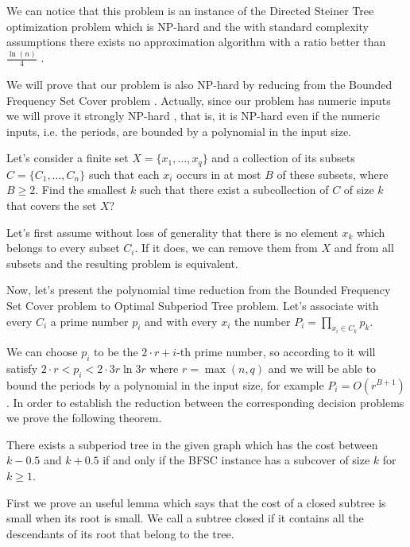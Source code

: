 We can notice that this problem is an instance of the Directed Steiner Tree optimization problem which is NP-hard and the with standard complexity assumptions there exists no approximation algorithm with a ratio better than $\frac {\ln (n)} 4$ \citep{zelikovsky1997series, ming2006fasterdsp}.

We will prove that our problem is also NP-hard by reducing from the Bounded Frequency Set Cover problem \citep{gary1979computers, cmulecture}. Actually, since our problem has numeric inputs we will prove it strongly NP-hard \citep{garey1978strong}, that is, it is NP-hard even if the numeric inputs, i.e. the periods, are bounded by a polynomial in the input size.

\begin{problem} Let's consider a finite set $X=\{x_1,\ldots,x_q\}$ and a collection of its subsets $C=\{C_1,\ldots, C_n\}$ such that each $x_i$ occurs in at most $B$ of these subsets, where $B \geq 2$. Find the smallest $k$ such that there exist a subcollection of $C$ of size $k$ that covers the set $X$?
\end{problem}

Let's first assume without loss of generality that there is no element $x_k$ which belongs to every subset $C_i$. If it does, we can remove them from $X$ and from all subsets and the resulting problem is equivalent.

Now, let’s present the polynomial time reduction from the Bounded Frequency Set Cover problem to Optimal Subperiod Tree problem. Let's associate with every $C_i$ a prime number $p_i$ and with every $x_i$ the number $P_i=\prod_{x_i\in C_k}p_k$.

We can choose $p_i$ to be the $2\cdot r+i$-th prime number, so according to \citep{jaroma2005upper} it will satisfy $2\cdot r <p_i<2\cdot 3r \ln 3r$ where $r=\max(n, q)$ and we will be able to bound the periods by a polynomial in the input size, for example $P_i=O(r^{B+1})$. In order to establish the reduction between the corresponding decision problems we prove the following theorem. 

\begin{theorem}\label{theorem}
There exists a subperiod tree in the given graph which has the cost between $k-0.5$ and $k+0.5$ if and only if the BFSC instance has a subcover of size $k$ for $k \ge  1$.
\end{theorem}

First we prove an useful lemma which says that the cost of a closed subtree is small when its root is small. We call a subtree closed if it contains all the descendants of its root that belong to the tree. 


